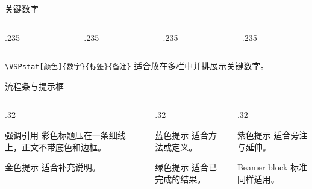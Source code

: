 \documentclass[aspectratio=169,10pt]{beamer}
\begin{document}
\begin{frame}[t]{关键数字}
\begin{columns}[T,onlytextwidth]
  \begin{column}{.235\textwidth}\end{column}
  \begin{column}{.235\textwidth}\end{column}
  \begin{column}{.235\textwidth}\end{column}
  \begin{column}{.235\textwidth}\end{column}
\end{columns}

\vspace{4pt}
\texttt{\textbackslash VSPstat[颜色]\{数字\}\{标签\}\{备注\}} 适合放在多栏中并排展示关键数字。

\end{frame}

\begin{frame}[t]{流程条与提示框}

\vspace{6pt}
\begin{columns}[T,onlytextwidth]
  \begin{column}{.32\textwidth}
    \begin{vspquote}{强调引用}
      彩色标题压在一条细线上，正文不带底色和边框。
    \end{vspquote}
    \begin{vspquoteyellow}{金色提示}
      适合补充说明。
    \end{vspquoteyellow}
  \end{column}
  \begin{column}{.32\textwidth}
    \begin{vspquoteblue}{蓝色提示}
      适合方法或定义。
    \end{vspquoteblue}
    \begin{vspquotegreen}{绿色提示}
      适合已完成的结果。
    \end{vspquotegreen}
  \end{column}
  \begin{column}{.32\textwidth}
    \begin{vspquotepurple}{紫色提示}
      适合旁注与延伸。
    \end{vspquotepurple}
    \begin{block}{Beamer block}
      标准  同样适用。
    \end{block}
  \end{column}
\end{columns}
\end{frame}
\end{document}
